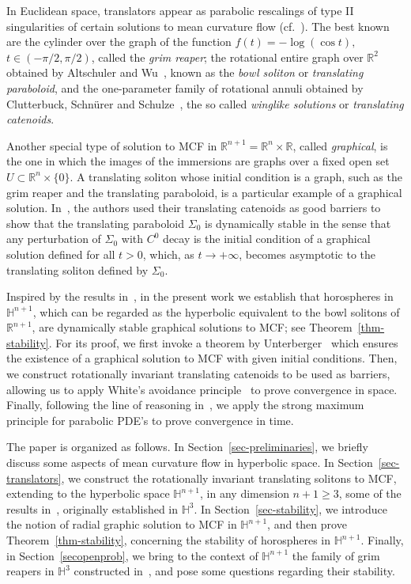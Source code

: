 \documentclass{amsart}[12pt]
\newcommand{\hn}[1]{\h^{#1}}
\theoremstyle{definition}
\theoremstyle{plain}
\newcommand{\R}{\mathbb{R} }
\newcommand{\h}{\mathbb{H} }
\renewcommand{\Sigma}{\varSigma}
\begin{document}
In Euclidean space, translators appear
as parabolic rescalings of type II singularities of certain solutions to mean curvature flow (cf.~\cite{HS}).
The best known are the cylinder over the
graph of the function $f(t) = -\log(\cos t),$ $t\in(-\pi/2,\pi/2)$, called the \emph{grim reaper};
the rotational entire graph over $\R^2$
obtained by Altschuler and Wu~\cite{altschuler}, known as the
\emph{bowl soliton} or \emph{translating paraboloid}, and the one-parameter family of rotational
annuli obtained by Clutterbuck, Schnürer and Schulze~\cite{schulze},
the so called \emph{winglike solutions} or \emph{translating catenoids}.

Another special type of solution to MCF in $\R^{n+1}=\R^n\times\R$, called \emph{graphical}, is the one in which
the images of the immersions are graphs over a fixed open set $U\subset\R^n\times\{0\}$. A translating soliton whose initial condition
is a graph, such as the grim reaper and the translating paraboloid, is a particular example of a graphical solution.
In~\cite{schulze}, the authors used their translating catenoids as good barriers to show that the translating paraboloid $\Sigma_0$
is dynamically stable in the sense that
any   perturbation of $\Sigma_0$ with $C^0$ decay is the initial condition of a graphical solution defined
for all $t>0$, which, as $t\to+\infty$, becomes asymptotic to the
translating soliton defined by $\Sigma_0$.

Inspired by the results in~\cite{schulze},
in the present work
we establish that horospheres in $\h^{n+1}$, which can be regarded
as the hyperbolic equivalent to the bowl solitons of $\R^{n+1}$,
are dynamically stable graphical solutions to MCF; see Theorem~\ref{thm-stability}.
For its proof, we first invoke a theorem by Unterberger~\cite{unterberger} which ensures
the existence of a graphical solution to MCF with given initial conditions. Then, we construct rotationally invariant
translating catenoids to be used
as barriers, allowing us to apply White's avoidance
principle~\cite{white} to prove convergence in space. Finally,
following the line of reasoning in~\cite{schulze},
we apply the strong maximum principle for parabolic PDE's
to prove convergence in time.


The paper is organized as follows. In Section~\ref{sec-preliminaries},
we briefly discuss some aspects of mean curvature flow in
hyperbolic space. In Section~\ref{sec-translators},
we construct the rotationally invariant translating solitons
to MCF, extending to the hyperbolic space $\hn{n+1}$,
in any dimension $n+1\geq3$, some of the results in~\cite{dLRS}, originally
established in $\h^{3}$. In Section~\ref{sec-stability},
we introduce the notion of radial graphic solution to MCF in $\h^{n+1}$, and then
prove Theorem~\ref{thm-stability}, concerning the stability
of horospheres in $\h^{n+1}$. Finally, in
Section~\ref{secopenprob}, we bring to the context of $\hn{n+1}$
the family of grim reapers in $\hn3$ constructed in~\cite{dLRS}, and
pose some questions regarding their stability.
\end{document}
